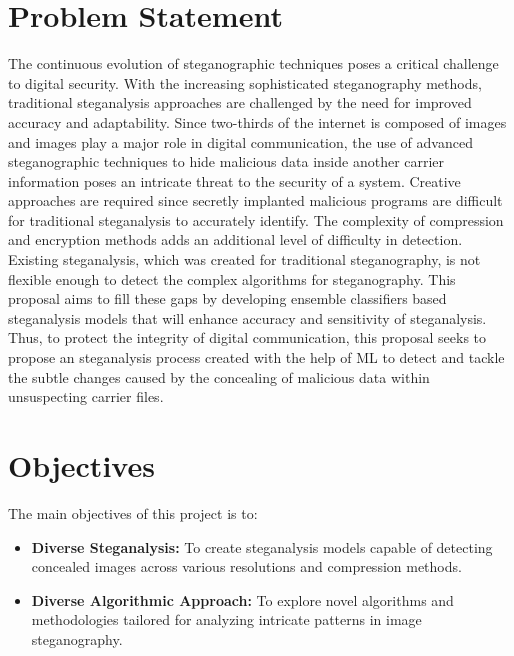 \section{Problem Statement}
The continuous evolution of steganographic techniques poses a critical challenge to digital security. With the increasing sophisticated steganography methods, traditional steganalysis approaches are challenged by the need for improved accuracy and adaptability. Since two-thirds of the internet is composed of images and images play a major role in digital communication, the use of advanced steganographic techniques to hide malicious data inside another carrier information poses an intricate threat to the security of a system. Creative approaches are required since secretly implanted malicious programs are difficult for traditional steganalysis to accurately identify. The complexity of compression and encryption methods adds an additional level of difficulty in detection. Existing steganalysis, which was created for traditional steganography, is not flexible enough to detect the complex algorithms for steganography. This proposal aims to fill these gaps by developing ensemble classifiers based steganalysis models that will enhance accuracy and sensitivity of steganalysis. Thus, to protect the integrity of digital communication, this proposal seeks to propose an steganalysis process created with the help of ML to detect and tackle the subtle changes caused by the concealing of malicious data within unsuspecting carrier files.
\clearpage
\section{Objectives}
The main objectives of this project is to:
\begin{itemize}
\item \textbf{Diverse Steganalysis:} To create steganalysis models capable of detecting concealed images across various  resolutions and compression methods.
\item \textbf{Diverse Algorithmic Approach:} To explore novel algorithms and methodologies tailored for analyzing intricate patterns in image steganography.
\end{itemize}


